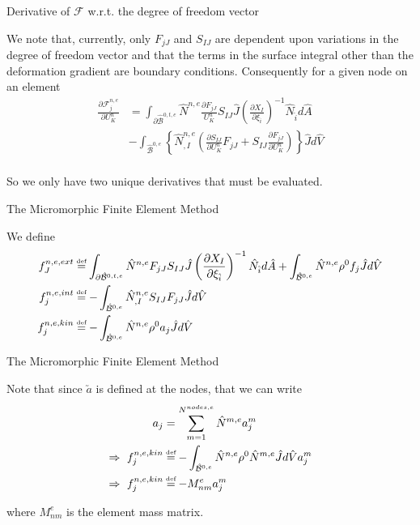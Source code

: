 \documentclass[11pt]{beamer}
\newcommand{\VEC}[1]{\utilde{#1}}
\newcommand\defeq{\mathrel{\stackrel{\makebox[0pt]{\mbox{\normalfont\tiny def}}}{=}}}
\begin{document}
\begin{frame}{Derivative of $\mathcal{F}$ w.r.t. the degree of freedom vector}

We note that, currently, only $F_{jJ}$ and $S_{IJ}$ are dependent upon variations in the degree of freedom vector and that the terms in the surface integral other than the deformation gradient are boundary conditions. Consequently for a given node on an element
\begin{align*}
\frac{\partial \mathcal{F}_{j}^{n,e}}{\partial U_K^n} &= \int_{\partial \hat{\mathcal{B}}^{0,t,e}} \hat{N}^{n,e} \frac{\partial F_{jJ}}{U_K^n} S_{IJ} \hat{J} \left(\frac{\partial X_{I}}{\partial \xi_{\hat{i}}}\right)^{-1} \hat{N}_{\hat{i}} d\hat{A}\\ &- \int_{\hat{\mathcal{B}}^{0,e}} \left\{ \hat{N}^{n,e}_{,I} \left(\frac{\partial S_{IJ}}{\partial U_K^n} F_{jJ} + S_{IJ} \frac{\partial F_{jJ}}{\partial U_K^n}\right)\right\} \hat{J} d\hat{V}\\
\end{align*}

So we only have two unique derivatives that must be evaluated.

\end{frame}

\begin{frame}{The Micromorphic Finite Element Method}

We define
\begin{align*}
f_{J}^{n,e,ext} &\defeq \int_{\partial \hat{\mathcal{B}}^{0,t,e}} \hat{N}^{n,e} F_{jJ} S_{IJ} \hat{J} \left(\frac{\partial X_{I}}{\partial \xi_{\hat{i}}}\right)^{-1} \hat{N}_{\hat{i}} d\hat{A} + \int_{\hat{\mathcal{B}}^{0,e}}  \hat{N}^{n,e} \rho^0 f_j \hat{J} d\hat{V}\\
f_{j}^{n,e,int} &\defeq -\int_{\hat{\mathcal{B}}^{0,e}}\hat{N}^{n,e}_{,I} S_{IJ} F_{jJ} \hat{J} d\hat{V}\\
f_{j}^{n,e,kin} &\defeq -\int_{\hat{\mathcal{B}}^{0,e}} \hat{N}^{n,e} \rho^0 a_j \hat{J} d\hat{V}\\
\end{align*}

\end{frame}

\begin{frame}{The Micromorphic Finite Element Method}

Note that since $\VEC{a}$ is defined at the nodes, that we can write
\begin{align*}
a_j &= \sum_{m=1}^{N^{nodes,e}} \hat{N}^{m,e} a_j^m\\
\Rightarrow\ f_{j}^{n,e,kin} &\defeq -\int_{\hat{\mathcal{B}}^{0,e}} \hat{N}^{n,e} \rho^0 \hat{N}^{m,e} \hat{J} d\hat{V} a_j^m\\
\Rightarrow\ f_{j}^{n,e,kin} &\defeq - M_{nm}^e a_j^m
\end{align*}

where $M_{nm}^e$ is the element mass matrix.

\end{frame}
\end{document}
